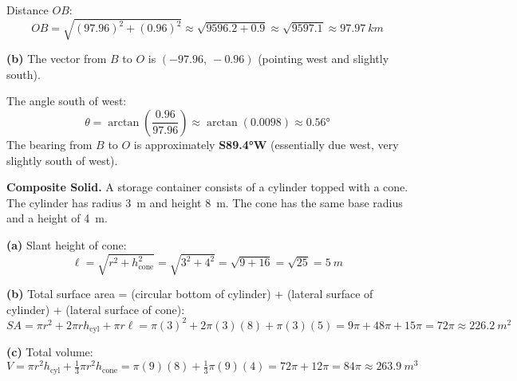 \documentclass[addpoints]{exam}
\begin{document}
\begin{questions}
\begin{solution}
Distance $OB$:
\[
OB = \sqrt{(97.96)^2 + (0.96)^2} \approx \sqrt{9596.2 + 0.9} \approx \sqrt{9597.1} \approx \SI{97.97}{km}
\]

\textbf{(b)} The vector from $B$ to $O$ is $(-97.96,\ -0.96)$ (pointing west and slightly south).

The angle south of west:
\[
\theta = \arctan\!\left(\frac{0.96}{97.96}\right) \approx \arctan(0.0098) \approx \ang{0.56}
\]
The bearing from $B$ to $O$ is approximately \textbf{S\ang{89.4}W} (essentially due west, very slightly south of west).
\end{solution}

\vspace{5mm}

\question[5]
\textbf{Composite Solid.}
A storage container consists of a cylinder topped with a cone. The cylinder has radius \SI{3}{m} and height \SI{8}{m}. The cone has the same base radius and a height of \SI{4}{m}.


\begin{solution}
\textbf{(a)} Slant height of cone:
\[
\ell = \sqrt{r^2 + h_{\text{cone}}^2} = \sqrt{3^2 + 4^2} = \sqrt{9+16} = \sqrt{25} = \SI{5}{m}
\]

\textbf{(b)} Total surface area = (circular bottom of cylinder) + (lateral surface of cylinder) + (lateral surface of cone):
\[
SA = \pi r^2 + 2\pi r h_{\text{cyl}} + \pi r \ell
   = \pi(3)^2 + 2\pi(3)(8) + \pi(3)(5)
   = 9\pi + 48\pi + 15\pi
   = 72\pi \approx \SI{226.2}{m^2}
\]

\textbf{(c)} Total volume:
\[
V = \pi r^2 h_{\text{cyl}} + \tfrac{1}{3}\pi r^2 h_{\text{cone}}
  = \pi(9)(8) + \tfrac{1}{3}\pi(9)(4)
  = 72\pi + 12\pi
  = 84\pi \approx \SI{263.9}{m^3}
\]
\end{solution}


\end{questions}
\end{document}
